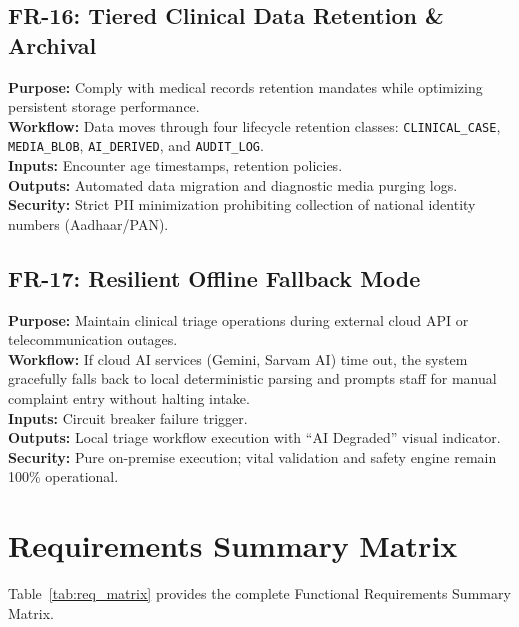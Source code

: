 \documentclass[11pt,a4paper,oneside]{report}
\begin{document}
\subsection{FR-16: Tiered Clinical Data Retention \& Archival}
\textbf{Purpose:} Comply with medical records retention mandates while optimizing persistent storage performance.\\
\textbf{Workflow:} Data moves through four lifecycle retention classes: \texttt{CLINICAL\_CASE}, \texttt{MEDIA\_BLOB}, \texttt{AI\_DERIVED}, and \texttt{AUDIT\_LOG}.\\
\textbf{Inputs:} Encounter age timestamps, retention policies.\\
\textbf{Outputs:} Automated data migration and diagnostic media purging logs.\\
\textbf{Security:} Strict PII minimization prohibiting collection of national identity numbers (Aadhaar/PAN).

\subsection{FR-17: Resilient Offline Fallback Mode}
\textbf{Purpose:} Maintain clinical triage operations during external cloud API or telecommunication outages.\\
\textbf{Workflow:} If cloud AI services (Gemini, Sarvam AI) time out, the system gracefully falls back to local deterministic parsing and prompts staff for manual complaint entry without halting intake.\\
\textbf{Inputs:} Circuit breaker failure trigger.\\
\textbf{Outputs:} Local triage workflow execution with ``AI Degraded'' visual indicator.\\
\textbf{Security:} Pure on-premise execution; vital validation and safety engine remain 100\% operational.

\section{Requirements Summary Matrix}
Table~\ref{tab:req_matrix} provides the complete Functional Requirements Summary Matrix.
\end{document}
